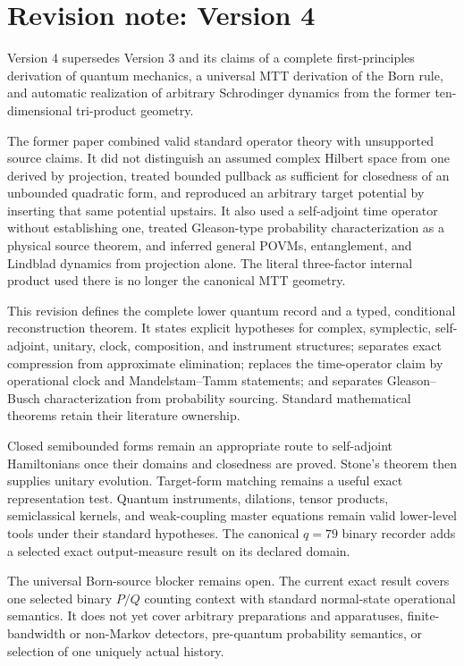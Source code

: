 \documentclass[11pt]{article}
\theoremstyle{definition}
\theoremstyle{remark}
\let\MTToriginalitem\item
\renewcommand{\item}{\par\MTToriginalitem}
\begin{document}
\section*{Revision note: Version 4}
\begin{description}[leftmargin=2.5cm,style=nextline]
\item[Supersedes]
Version 4 supersedes Version 3 and its claims of a complete first-principles
derivation of quantum mechanics, a universal MTT derivation of the Born rule,
and automatic realization of arbitrary Schrodinger dynamics from the former
ten-dimensional tri-product geometry.

\item[Reason]
The former paper combined valid standard operator theory with unsupported
source claims.  It did not distinguish an assumed complex Hilbert space from
one derived by projection, treated bounded pullback as sufficient for
closedness of an unbounded quadratic form, and reproduced an arbitrary
target potential by inserting that same potential upstairs.  It also used a
self-adjoint time operator without establishing one, treated Gleason-type
probability characterization as a physical source theorem, and inferred
general POVMs, entanglement, and Lindblad dynamics from projection alone.
The literal three-factor internal product used there is no longer the
canonical MTT geometry.

\item[Resolution]
This revision defines the complete lower quantum record and a typed,
conditional reconstruction theorem.  It states explicit hypotheses for
complex, symplectic, self-adjoint, unitary, clock, composition, and
instrument structures; separates exact compression from approximate
elimination; replaces the time-operator claim by operational clock and
Mandelstam--Tamm statements; and separates Gleason--Busch characterization
from probability sourcing.  Standard mathematical theorems retain their
literature ownership.

\item[Retained content]
Closed semibounded forms remain an appropriate route to self-adjoint
Hamiltonians once their domains and closedness are proved.  Stone's theorem
then supplies unitary evolution.  Target-form matching remains a useful
exact representation test.  Quantum instruments, dilations, tensor
products, semiclassical kernels, and weak-coupling master equations remain
valid lower-level tools under their standard hypotheses.  The canonical
\(q=79\) binary recorder adds a selected exact output-measure result on its
declared domain.

\item[Remaining boundary]
The universal Born-source blocker remains open.  The current exact result
covers one selected binary \(P/Q\) counting context with standard
normal-state operational semantics.  It does not yet cover arbitrary
preparations and apparatuses, finite-bandwidth or non-Markov detectors,
pre-quantum probability semantics, or selection of one uniquely actual
history.
\end{description}
\end{document}

